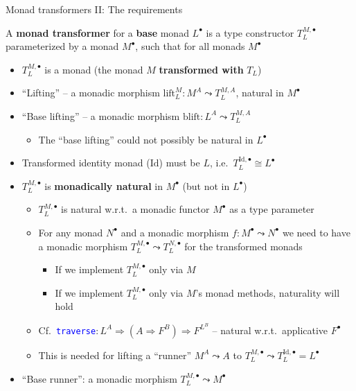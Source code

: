 \documentclass[english]{beamer}
\begin{document}
\begin{frame}{Monad transformers II: The requirements}

{\footnotesize{}\vspace{-0.1cm}}A \textbf{monad transformer} for
a \textbf{base} monad $L^{\bullet}$ is a type constructor $T_{L}^{M,\bullet}$
parameterized by a monad $M^{\bullet}$, such that for all monads
$M^{\bullet}$
\begin{itemize}
\item $T_{L}^{M,\bullet}$ is a monad (the monad $M$ \textbf{transformed
with} $T_{L}$)
\item ``Lifting'' -- a monadic morphism $\text{lift}_{L}^{M}:M^{A}\leadsto T_{L}^{M,A}$,
natural in $M^{\bullet}$
\item ``Base lifting'' -- a monadic morphism $\text{blift}:L^{A}\leadsto T_{L}^{M,A}$
\begin{itemize}
\item The ``base lifting'' could not possibly be natural in $L^{\bullet}$
\end{itemize}
\item Transformed identity monad ($\text{Id}$) must be $L$, i.e.~$T_{L}^{\text{Id},\bullet}\cong L^{\bullet}$
\item $T_{L}^{M,\bullet}$ is \textbf{monadically natural} in $M^{\bullet}$
(but not in $L^{\bullet}$)
\begin{itemize}
\item $T_{L}^{M,\bullet}$ is natural w.r.t.~a monadic functor $M^{\bullet}$
as a type parameter
\item For any monad $N^{\bullet}$ and a monadic morphism $f:M^{\bullet}\leadsto N^{\bullet}$
we need to have a monadic morphism $T_{L}^{M,\bullet}\leadsto T_{L}^{N,\bullet}$
for the transformed monads
\begin{itemize}
\item If we implement $T_{L}^{M,\bullet}$ only via $M$\item If we implement $T_{L}^{M,\bullet}$ only via $M$'s monad methods,
naturality will hold 
\end{itemize}
\item Cf.~\texttt{\textcolor{blue}{\footnotesize{}traverse}}{\small{}$:L^{A}\Rightarrow\left(A\Rightarrow F^{B}\right)\Rightarrow F^{L^{B}}$
-- natural w.r.t.~applicative $F^{\bullet}$}{\small\par}
\item This is needed for lifting a ``runner'' $M^{A}\leadsto A$ to $T_{L}^{M,\bullet}\leadsto T_{L}^{\text{Id},\bullet}=L^{\bullet}$
\end{itemize}
\item ``Base runner'': a monadic morphism $T_{L}^{M,\bullet}\leadsto M^{\bullet}$
\end{itemize}
\end{frame}
\end{document}

